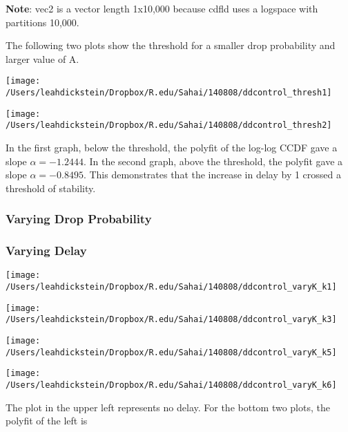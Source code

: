 \documentclass[leqno,twocolumn]{article}
\begin{document}
\textbf{Note}: vec2 is a vector length 1x10,000 because cdfld uses a logspace with partitions 10,000.

The following two plots show the threshold for a smaller drop probability and larger value of A. 

\begin{minipage}[c]{0.5\textwidth}
\texttt{[image: /Users/leahdickstein/Dropbox/R.edu/Sahai/140808/ddcontrol\_thresh1]}
\end{minipage}
\begin{minipage}[c]{0.5\textwidth}
\texttt{[image: /Users/leahdickstein/Dropbox/R.edu/Sahai/140808/ddcontrol\_thresh2]}
\end{minipage}

In the first graph, below the threshold, the polyfit of the log-log CCDF gave a slope $\alpha = -1.2444$. In the second graph, above the threshold, the polyfit gave a slope $\alpha = -0.8495 $. This demonstrates that the increase in delay by 1 crossed a threshold of stability.

\subsubsection{Varying Drop Probability}

\subsubsection{Varying Delay}

\begin{minipage}[c]{0.5\textwidth}
\texttt{[image: /Users/leahdickstein/Dropbox/R.edu/Sahai/140808/ddcontrol\_varyK\_k1]}
\end{minipage}
\begin{minipage}[c]{0.5\textwidth}
\texttt{[image: /Users/leahdickstein/Dropbox/R.edu/Sahai/140808/ddcontrol\_varyK\_k3]}
\end{minipage}

\begin{minipage}[c]{0.5\textwidth}
\texttt{[image: /Users/leahdickstein/Dropbox/R.edu/Sahai/140808/ddcontrol\_varyK\_k5]}
\end{minipage}
\begin{minipage}[c]{0.5\textwidth}
\texttt{[image: /Users/leahdickstein/Dropbox/R.edu/Sahai/140808/ddcontrol\_varyK\_k6]}
\end{minipage}

The plot in the upper left represents no delay. For the bottom two plots, the polyfit of the left is
\end{document}
